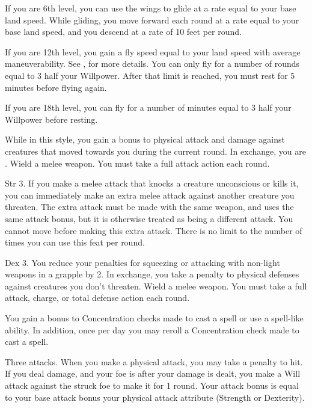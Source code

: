 If you are 6th level, you can use the wings to glide at a rate equal to your base land speed.
While gliding, you move forward each round at a rate equal to your base land speed, and you descend at a rate of 10 feet per round.

If you are 12th level, you gain a fly speed equal to your land speed with average maneuverability.
See , for more details.
You can only fly for a number of rounds equal to 3 \add half your Willpower.
After that limit is reached, you must rest for 5 minutes before flying again.

If you are 18th level, you can fly for a number of minutes equal to 3 \add half your Willpower before resting.

\featben While in this style, you gain a  bonus to physical attack and damage against creatures that moved towards you during the current round.
In exchange, you are \immobilized.
\stylereq Wield a melee weapon.
You must take a full attack action each round.

\featpres
Str 3.
\featben If you make a melee attack that knocks a creature unconscious or kills it, you can immediately make an extra melee attack against another creature you threaten.
The extra attack must be made with the same weapon, and uses the same attack bonus, but it is otherwise treated as being a different attack.
You cannot move before making this extra attack.
There is no limit to the number of times you can use this feat per round.

\featpre Dex 3.
\featben You reduce your penalties for squeezing or attacking with non-light weapons in a grapple by 2.
In exchange, you take a  penalty to physical defenses against creatures you don't threaten.
\stylereq Wield a melee weapon.
You must take a full attack, charge, or total defense action each round.

\featben You gain a  bonus to Concentration checks made to cast a spell or use a spell-like ability.
In addition, once per day you may reroll a Concentration check made to cast a spell.

\featpre Three attacks.
\featben When you make a physical attack, you may take a  penalty to hit.
If you deal damage, and your foe is \bloodied after your damage is dealt, you make a Will attack against the struck foe to make it \confused for 1 round.
Your attack bonus is equal to your base attack bonus \add your physical attack attribute (Strength or Dexterity).


